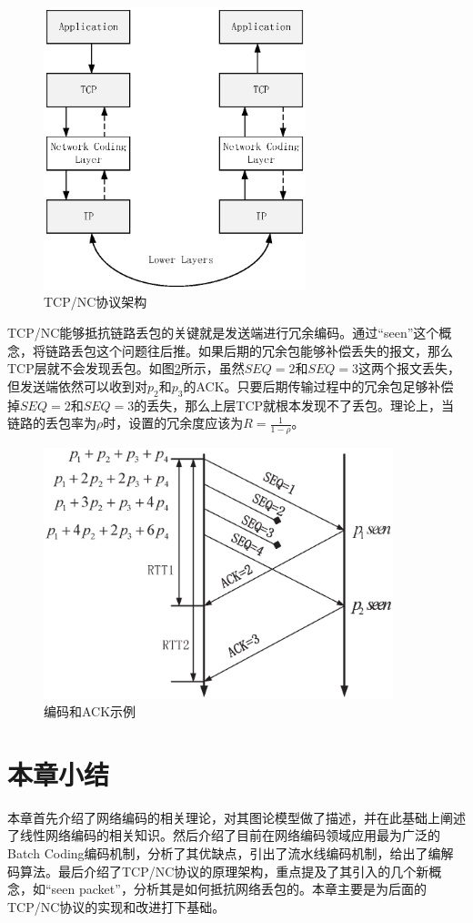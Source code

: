 \begin{figure}[htbp]
	\centering
	\includegraphics[width=3in]{figures/tcpnc.eps}
	\caption{TCP/NC协议架构}
	\label{TCPNC_EPS}
\end{figure}
\par
TCP/NC能够抵抗链路丢包的关键就是发送端进行冗余编码。通过“seen”这个概念，将链路丢包这个问题往后推。如果后期的冗余包能够补偿丢失的报文，那么TCP层就不会发现丢包。如图\ref{CODINGACK_EPS}所示，虽然$SEQ=2$和$SEQ=3$这两个报文丢失，但发送端依然可以收到对$p_{2}$和$p_{3}$的ACK。只要后期传输过程中的冗余包足够补偿掉$SEQ=2$和$SEQ=3$的丢失，那么上层TCP就根本发现不了丢包。理论上，当链路的丢包率为$\rho$时，设置的冗余度应该为$R=\frac{1}{1-\rho}$。
\begin{figure}[htbp]
	\centering
	\includegraphics[width=4in]{figures/codingack.eps}
	\caption{编码和ACK示例}
	\label{CODINGACK_EPS}
\end{figure}
\section{本章小结}
本章首先介绍了网络编码的相关理论，对其图论模型做了描述，并在此基础上阐述了线性网络编码的相关知识。然后介绍了目前在网络编码领域应用最为广泛的Batch Coding编码机制，分析了其优缺点，引出了流水线编码机制，给出了编解码算法。最后介绍了TCP/NC协议的原理架构，重点提及了其引入的几个新概念，如“seen packet”，分析其是如何抵抗网络丢包的。本章主要是为后面的TCP/NC协议的实现和改进打下基础。 

